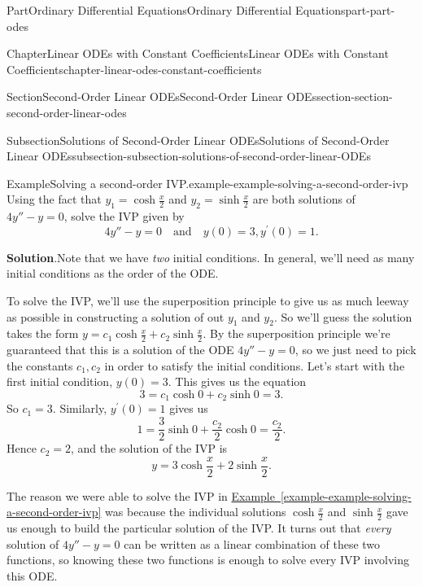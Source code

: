 \documentclass[twoside,10pt,]{book}
\newcommand{\blocktitlefont}{\relax}
\newcommand{\xreffont}{\relax}
\numberwithin{equation}{part}
\begin{document}
\begin{partptx}{Part}{Ordinary Differential Equations}{}{Ordinary Differential Equations}{}{}{part-part-odes}
\begin{chapterptx}{Chapter}{Linear ODEs with Constant Coefficients}{}{Linear ODEs with Constant Coefficients}{}{}{chapter-linear-odes-constant-coefficients}
\begin{sectionptx}{Section}{Second-Order Linear ODEs}{}{Second-Order Linear ODEs}{}{}{section-section-second-order-linear-odes}
\begin{subsectionptx}{Subsection}{Solutions of Second-Order Linear ODEs}{}{Solutions of Second-Order Linear ODEs}{}{}{subsection-subsection-solutions-of-second-order-linear-ODEs}
\begin{example}{Example}{Solving a second-order IVP.}{example-example-solving-a-second-order-ivp}%
Using the fact that \(y_{1} = \cosh\frac{x}{2}\) and \(y_{2} = \sinh\frac{x}{2}\) are both solutions of \(4y''-y = 0\), solve the IVP given by%
\begin{equation*}
4y''-y=0\quad\text{and}\quad y(0)=3,y^\prime(0)=1.
\end{equation*}
%
\par\smallskip%
\noindent\textbf{\blocktitlefont Solution}.\hypertarget{solution-example-solving-a-second-order-ivp-c}{}\quad{}Note that we have \emph{two} initial conditions. In general, we'll need as many initial conditions as the order of the ODE.%
\par
To solve the IVP, we'll use the superposition principle to give us as much leeway as possible in constructing a solution of out \(y_{1}\) and \(y_{2}\). So we'll guess the solution takes the form \(y = c_{1}\cosh\frac{x}{2} + c_{2}\sinh\frac{x}{2}\). By the superposition principle we're guaranteed that this is a solution of the ODE \(4y''-y=0\), so we just need to pick the constants \(c_{1},c_{2}\) in order to satisfy the initial conditions. Let's start with the first initial condition, \(y(0) = 3\). This gives us the equation%
\begin{equation*}
3 = c_{1}\cosh0+c_{2}\sinh0 = 3.
\end{equation*}
So \(c_{1} = 3\). Similarly, \(y^\prime(0) = 1\) gives us%
\begin{equation*}
1 = \frac{3}{2}\sinh0+\frac{c_{2}}{2}\cosh0 = \frac{c_{2}}{2}.
\end{equation*}
Hence \(c_{2} = 2\), and the solution of the IVP is%
\begin{equation*}
y = 3\cosh\frac{x}{2} + 2\sinh\frac{x}{2}.
\end{equation*}
%
\end{example}
The reason we were able to solve the IVP in \hyperref[example-example-solving-a-second-order-ivp]{Example~{\xreffont\ref{example-example-solving-a-second-order-ivp}}} was because the individual solutions \(\cosh\frac{x}{2}\) and \(\sinh\frac{x}{2}\) gave us enough to build the particular solution of the IVP. It turns out that \emph{every} solution of \(4y''-y=0\) can be written as a linear combination of these two functions, so knowing these two functions is enough to solve every IVP involving this ODE.%
\par

\end{subsectionptx}
\end{sectionptx}
\end{chapterptx}
\end{partptx}
\end{document}
